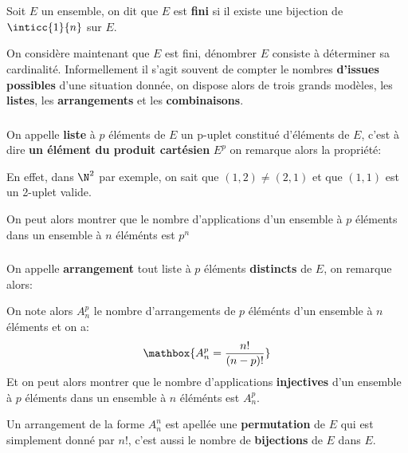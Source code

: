 \chapter*{}
Soit \(E\) un ensemble, on dit que \(E\) est \textbf{fini} si il existe une bijection de \(\inticc{1}{n}\) sur \(E\).\<

On considère maintenant que \(E\) est fini, dénombrer \(E\) consiste à déterminer sa cardinalité. Informellement il s'agit souvent de compter le nombres \textbf{d'issues possibles} d'une situation donnée, on dispose alors de trois grands modèles, les \textbf{listes}, les \textbf{arrangements} et les \textbf{combinaisons}.

\subsection*{}
On appelle \textbf{liste} à \(p\) éléments de \(E\) un p-uplet constitué d'éléments de \(E\), c'est à dire \textbf{un élément du produit cartésien} \(E^p\) on remarque alors la propriété:
\begin{center}
\end{center}
En effet, dans \(\N^2\) par exemple, on sait que \((1, 2) \neq (2, 1)\) et que \((1, 1)\) est un 2-uplet valide.\<

On peut alors montrer que le nombre d'applications d'un ensemble à \(p\) éléments dans un ensemble à \(n\) éléménts est \(p^n\)

\subsection*{}
On appelle \textbf{arrangement} tout liste à \(p\) éléments \textbf{distincts} de \(E\), on remarque alors:
\begin{center}
\end{center}
On note alors \(A_n^p\) le nombre d'arrangements de \(p\) éléménts d'un ensemble à \(n\) éléments et on a:
\[
   \mathbox{A_n^p = \frac{n!}{(n - p)!}}   
\]
Et on peut alors montrer que le nombre d'applications \textbf{injectives} d'un ensemble à \(p\) éléments dans un ensemble à \(n\) éléménts est \(A_n^p\).\<

Un arrangement de la forme \(A_n^n\) est apellée une \textbf{permutation} de \(E\) qui est simplement donné par \(n!\), c'est aussi le nombre de \textbf{bijections} de \(E\) dans \(E\).

